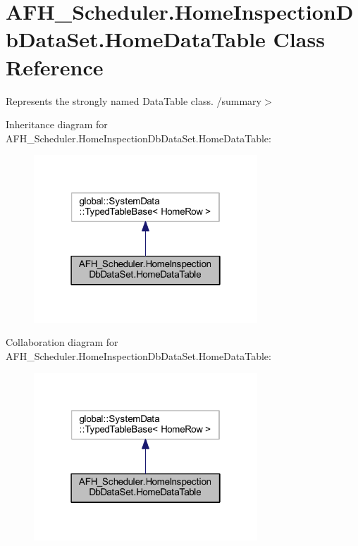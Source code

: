 \section{A\+F\+H\+\_\+\+Scheduler.\+Home\+Inspection\+Db\+Data\+Set.\+Home\+Data\+Table Class Reference}
\label{class_a_f_h___scheduler_1_1_home_inspection_db_data_set_1_1_home_data_table}


Represents the strongly named Data\+Table class. /summary$>$  




Inheritance diagram for A\+F\+H\+\_\+\+Scheduler.\+Home\+Inspection\+Db\+Data\+Set.\+Home\+Data\+Table\+:
\nopagebreak
\begin{figure}[H]
\begin{center}
\leavevmode
\includegraphics[width=238pt]{class_a_f_h___scheduler_1_1_home_inspection_db_data_set_1_1_home_data_table__inherit__graph}
\end{center}
\end{figure}


Collaboration diagram for A\+F\+H\+\_\+\+Scheduler.\+Home\+Inspection\+Db\+Data\+Set.\+Home\+Data\+Table\+:
\nopagebreak
\begin{figure}[H]
\begin{center}
\leavevmode
\includegraphics[width=238pt]{class_a_f_h___scheduler_1_1_home_inspection_db_data_set_1_1_home_data_table__coll__graph}
\end{center}
\end{figure}
